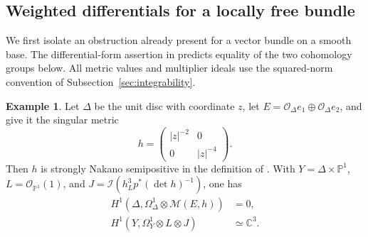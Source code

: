 \documentclass[11pt,reqno]{amsart}
\numberwithin{equation}{section}
\theoremstyle{definition}
\newtheorem{example}[theorem]{Example}
\theoremstyle{remark}
\newcommand{\OO}{\mathcal O}
\newcommand{\MM}{\mathcal M}
\newcommand{\II}{\mathcal I}
\newcommand{\PP}{\mathbb P}
\newcommand{\CC}{\mathbb C}
\begin{document}
\subsection{Weighted differentials for a locally free bundle}
We first isolate an obstruction already present for a vector bundle on a smooth base. The differential-form assertion in \cite[Theorem 1.3(ii)]{LLYZpre} predicts equality of the two cohomology groups below. All metric values and multiplier ideals use the squared-norm convention of Subsection~\ref{sec:integrability}.
\begin{example}\label{ex:weighted-differentials}
Let $\Delta$ be the unit disc with coordinate $z$, let
$E=\OO_\Delta e_1\oplus\OO_\Delta e_2$, and give it the singular metric
\[
 h=\begin{pmatrix}|z|^{-2}&0\\0&|z|^{-4}\end{pmatrix}.
\]
Then $h$ is strongly Nakano semipositive in the definition of
\cite{LLYZpre}. With $Y=\Delta\times\PP^1$, $L=\OO_{\PP^1}(1)$, and
$J=\II(h_L^3p^*(\det h)^{-1})$, one has
\begin{align}
 H^1(\Delta,\Omega_\Delta^1\otimes\MM(E,h))&=0,\label{eq:leftzero}\\
 H^1(Y,\Omega_Y^1\otimes L\otimes J)&\simeq\CC^3.\label{eq:rightthree}
\end{align}
\end{example}
\end{document}
